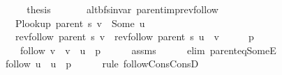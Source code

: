 \begin{isabellebody}
\ \ \isamarkupfalse%
\ \isamarkupfalse%
\ {\isacharquery}{\kern0pt}thesis\isanewline
\ \ \ \ \isacommand{{\isachardot}{\kern0pt}}\isamarkupfalse%
\isanewline
{}\isamarkupfalse%
%
\endisatagproof
{\isafoldproof}%
%
\isadelimproof
\isanewline
%
\endisadelimproof
%
\isadeliminvisible
\isanewline
%
\endisadeliminvisible
%
\isataginvisible
{}\isamarkupfalse%
\ {\isacharparenleft}{\kern0pt}\ alt{\isacharunderscore}{\kern0pt}bfs{\isacharunderscore}{\kern0pt}invar{\isacharparenright}{\kern0pt}\ parent{\isacharunderscore}{\kern0pt}imp{\isacharunderscore}{\kern0pt}rev{\isacharunderscore}{\kern0pt}follow{\isacharcolon}{\kern0pt}\isanewline
\ \ \ {\isachardoublequoteopen}P{\isacharunderscore}{\kern0pt}lookup\ {\isacharparenleft}{\kern0pt}parent\ s{\isacharparenright}{\kern0pt}\ v\ {\isacharequal}{\kern0pt}\ Some\ u{\isachardoublequoteclose}\isanewline
\ \ \ {\isachardoublequoteopen}rev{\isacharunderscore}{\kern0pt}follow\ {\isacharparenleft}{\kern0pt}parent\ s{\isacharparenright}{\kern0pt}\ v\ {\isacharequal}{\kern0pt}\ rev{\isacharunderscore}{\kern0pt}follow\ {\isacharparenleft}{\kern0pt}parent\ s{\isacharparenright}{\kern0pt}\ u\ {\isacharat}{\kern0pt}\ {\isacharbrackleft}{\kern0pt}v{\isacharbrackright}{\kern0pt}{\isachardoublequoteclose}%
\endisataginvisible
{\isafoldinvisible}%
%
\isadeliminvisible
\isanewline
%
\endisadeliminvisible
%
\isadelimproof
%
\endisadelimproof
%
\isatagproof
{}\isamarkupfalse%
\ {\isacharminus}{\kern0pt}\isanewline
\ \ \isamarkupfalse%
\ p\ \isanewline
\ \ \ \ {\isachardoublequoteopen}follow\ v\ {\isacharequal}{\kern0pt}\ v\ {\isacharhash}{\kern0pt}\ u\ {\isacharhash}{\kern0pt}\ p{\isachardoublequoteclose}\isanewline
\ \ \ \ \isamarkupfalse%
\ assms\isanewline
\ \ \ \ \isamarkupfalse%
\ {\isacharparenleft}{\kern0pt}elim\ parent{\isacharunderscore}{\kern0pt}eq{\isacharunderscore}{\kern0pt}SomeE{\isacharparenright}{\kern0pt}\isanewline
\ \ \isamarkupfalse%
\ \isamarkupfalse%
\ {\isachardoublequoteopen}follow\ u\ {\isacharequal}{\kern0pt}\ u\ {\isacharhash}{\kern0pt}\ p{\isachardoublequoteclose}\isanewline
\ \ \ \ \isamarkupfalse%
\ {\isacharparenleft}{\kern0pt}rule\ follow{\isacharunderscore}{\kern0pt}Cons{\isacharunderscore}{\kern0pt}ConsD{\isacharparenleft}{\kern0pt}{}{\isacharparenright}{\kern0pt}{\isacharparenright}{\kern0pt}\isanewline
\ \ \isamarkupfalse%

\end{isabellebody}
